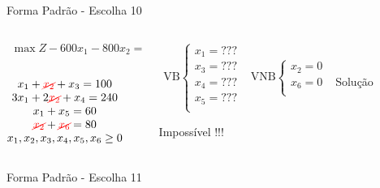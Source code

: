 \documentclass{beamer}
\begin{document}
\begin{frame}
{\begin{block}{Forma Padrão - {\color{cyan}Escolha 10}}
			\begin{columns}
				\begin{column}{0.35\textwidth}
					$
						\begin{matrix}
							\max Z - 600x_1 - 800x_2 = 0 \\
						\end{matrix}
					$ \\
					 \\
					$
						\begin{matrix}
							x_1  + {\color{red}\cancel{x_2}}  + x_3                   = 100 \\
							3x_1 + 2{\color{red}\cancel{x_2}}       + x_4             = 240 \\
							x_1                     + x_5       = 60 \\
							{\color{red}\cancel{x_2}}                          + {\color{red}\cancel{x_6}} = 80 \\
							x_1,x_2, x_3, x_4, x_5, x_6 \ge 0 \\
						\end{matrix}
					$
				\end{column}
				\vline
				\hspace{0.1cm}
				\begin{column}{0.45\textwidth}
						$
							\begin{matrix}
								\text{VB} \left\{  \begin{matrix}
																 x_1 = \text{???} \\
																 x_3 = \text{???} \\
																 x_4 = \text{???} \\
																 x_5 = \text{???} \\
												   \end{matrix} 
										   \right.
								&
								\text{VNB} \left\{  \begin{matrix}
																 x_2 = 0 \\
																 x_6 = 0 \\
												   \end{matrix} 
										   \right. 
								\\
							 & \\
							\end{matrix}
						$
						{\color{red}Solução Impossível !!!}
				\end{column}
			\end{columns}
		\end{block}
	}
	{
		\begin{block}{Forma Padrão - {\color{cyan}Escolha 11}}

\end{block}}
\end{frame}
\end{document}
